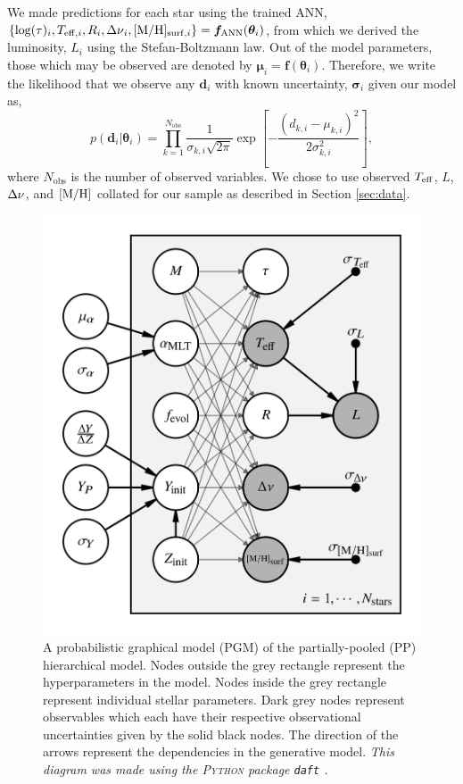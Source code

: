 We made predictions for each star using the trained ANN, $\{\log(\tau)_i, T_{\mathrm{eff}, i}, R_i, {\Delta\nu}_i, [\mathrm{M}/\mathrm{H}]_{\mathrm{surf}, i}\} = \boldsymbol{f}_{\mathrm{ANN}}(\boldsymbol{\theta}_i)$, from which we derived the luminosity, $L_i$ using the Stefan-Boltzmann law. Out of the model parameters, those which may be observed are denoted by ${\boldsymbol{\mu}}_{i} = {\boldsymbol{f}}(\boldsymbol{\theta}_i)$. Therefore, we write the likelihood that we observe any $\boldsymbol{d}_i$ with known uncertainty, $\boldsymbol{\sigma}_{i}$ given our model as,
%
\begin{equation}
    p(\boldsymbol{d}_i | \boldsymbol{\theta}_i) = \prod_{k=1}^{N_\mathrm{obs}} \frac{1}{\sigma_{k, i} \sqrt{2\pi}} \exp\left[ - \frac{(d_{k, i} - \mu_{k, i})^2}{2 \sigma_{k, i}^2} \right],
    \label{eq:like}
\end{equation}
%
where $N_\mathrm{obs}$ is the number of observed variables. We chose to use observed ${T_\mathrm{eff}}$, $L$, ${\Delta\nu}$, and $[\mathrm{M}/\mathrm{H}]$ collated for our sample as described in Section \ref{sec:data}.

\begin{figure}[tb]
    \centering
    \includegraphics{figures/partial_pool_pgm.png}
    \caption[A probabilistic graphical model of the partially-pooled hierarchical model.]{A probabilistic graphical model (PGM) of the partially-pooled (PP) hierarchical model. Nodes outside the grey rectangle represent the hyperparameters in the model. Nodes inside the grey rectangle represent individual stellar parameters. Dark grey nodes represent observables which each have their respective observational uncertainties given by the solid black nodes. The direction of the arrows represent the dependencies in the generative model. \emph{This diagram was made using the \textsc{Python} package \texttt{daft} \citep{Foreman-Mackey.Hogg.ea2021}.}}
    \label{fig:pgm}
\end{figure}

